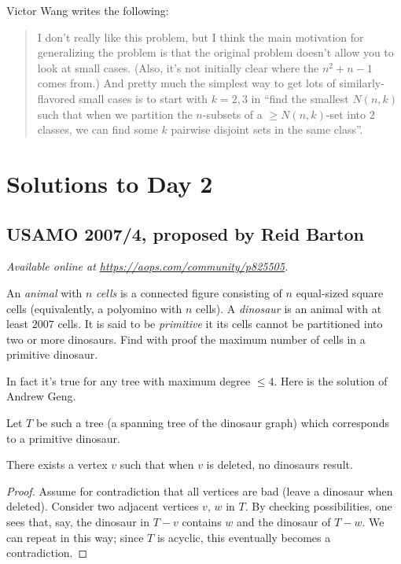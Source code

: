 \documentclass[11pt]{scrartcl}
\begin{document}
\begin{remark*}
  Victor Wang writes the following:
  \begin{quote}
  I don't really like this problem,
  but I think the main motivation for generalizing the problem
  is that the original problem doesn't allow you to look at small cases.
  (Also, it's not initially clear where the $n^2+n-1$ comes from.)
  And pretty much the simplest way to get lots of similarly-flavored
  small cases is to start with $k=2,3$ in
  ``find the smallest $N(n,k)$ such that when we partition the $n$-subsets
  of a $\ge N(n,k)$-set into $2$ classes,
  we can find some $k$ pairwise disjoint sets in the same class''.
  \end{quote}
\end{remark*}
\pagebreak

\section{Solutions to Day 2}
\subsection{USAMO 2007/4, proposed by Reid Barton}
\textsl{Available online at \url{https://aops.com/community/p825505}.}
\begin{mdframed}[style=mdpurplebox,frametitle={Problem statement}]
An \emph{animal} with $n$ \emph{cells}
is a connected figure consisting of $n$ equal-sized square cells
(equivalently, a polyomino with $n$ cells).
A \emph{dinosaur} is an animal with at least $2007$ cells.
It is said to be \emph{primitive}
it its cells cannot be partitioned into two or more dinosaurs.
Find with proof the maximum number of cells in a primitive dinosaur.
\end{mdframed}
In fact it's true for any tree with maximum degree $\le 4$.
Here is the solution of Andrew Geng.

Let $T$ be such a tree (a spanning tree of the dinosaur graph)
which corresponds to a primitive dinosaur.

\begin{claim*}
  There exists a vertex $v$ such that when $v$ is deleted, no dinosaurs result.
\end{claim*}
\begin{proof}
  Assume for contradiction that all vertices are bad
  (leave a dinosaur when deleted).
  Consider two adjacent vertices $v$, $w$ in $T$.
  By checking possibilities, one sees that, say,
  the dinosaur in $T-v$ contains $w$ and the dinosaur of $T-w$.
  We can repeat in this way; since $T$ is acyclic,
  this eventually becomes a contradiction.
\end{proof}
\end{document}
